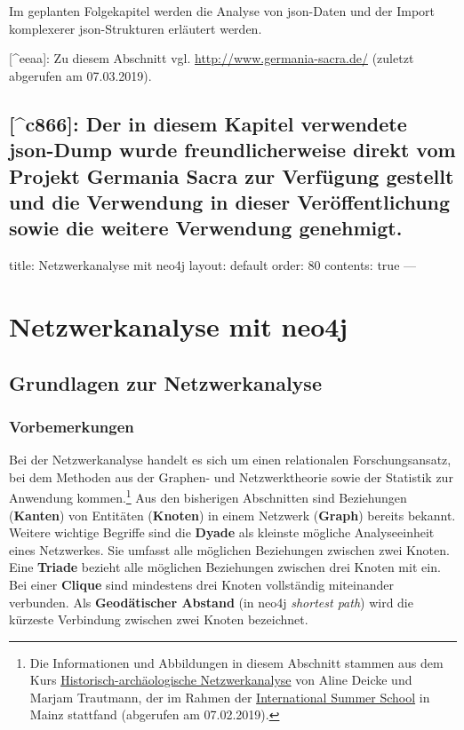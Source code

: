 \documentclass[12pt,ngerman,]{article}
\begin{document}
Im geplanten Folgekapitel werden die Analyse von json-Daten und der
Import komplexerer json-Strukturen erläutert werden.

{[}\^{}eeaa{]}: Zu diesem Abschnitt vgl.
\url{http://www.germania-sacra.de/} (zuletzt abgerufen am 07.03.2019).

\subsection{{[}\^{}c866{]}: Der in diesem Kapitel verwendete json-Dump
wurde freundlicherweise direkt vom Projekt Germania Sacra zur Verfügung
gestellt und die Verwendung in dieser Veröffentlichung sowie die weitere
Verwendung
genehmigt.}\label{c866-der-in-diesem-kapitel-verwendete-json-dump-wurde-freundlicherweise-direkt-vom-projekt-germania-sacra-zur-verfuxfcgung-gestellt-und-die-verwendung-in-dieser-veruxf6ffentlichung-sowie-die-weitere-verwendung-genehmigt.}

title: Netzwerkanalyse mit neo4j layout: default order: 80 contents:
true ---

\section{Netzwerkanalyse mit neo4j}\label{netzwerkanalyse-mit-neo4j}

\subsection{Grundlagen zur
Netzwerkanalyse}\label{grundlagen-zur-netzwerkanalyse}

\subsubsection{Vorbemerkungen}\label{vorbemerkungen}

Bei der Netzwerkanalyse handelt es sich um einen relationalen
Forschungsansatz, bei dem Methoden aus der Graphen- und Netzwerktheorie
sowie der Statistik zur Anwendung kommen.\footnote{Die Informationen und
  Abbildungen in diesem Abschnitt stammen aus dem Kurs
  \href{https://digitale-methodik.adwmainz.net/mod5/5c/slides/networkAnalysis/2018/\#/step-1}{Historisch-archäologische
  Netzwerkanalyse} von Aline Deicke und Marjam Trautmann, der im Rahmen
  der \href{https://iss.adwmainz.net}{International Summer School} in
  Mainz stattfand (abgerufen am 07.02.2019).} Aus den bisherigen
Abschnitten sind Beziehungen (\textbf{Kanten}) von Entitäten
(\textbf{Knoten}) in einem Netzwerk (\textbf{Graph}) bereits bekannt.
Weitere wichtige Begriffe sind die \textbf{Dyade} als kleinste mögliche
Analyseeinheit eines Netzwerkes. Sie umfasst alle möglichen Beziehungen
zwischen zwei Knoten. Eine \textbf{Triade} bezieht alle möglichen
Beziehungen zwischen drei Knoten mit ein. Bei einer \textbf{Clique} sind
mindestens drei Knoten vollständig miteinander verbunden. Als
\textbf{Geodätischer Abstand} (in neo4j \emph{shortest path}) wird die
kürzeste Verbindung zwischen zwei Knoten bezeichnet.
\end{document}
